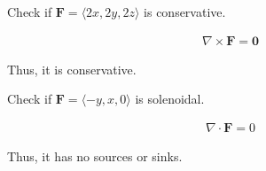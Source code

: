\begin{examplebox}
    Check if $\mathbf{F}=\langle 2x,2y,2z\rangle$ is conservative.

    \begin{align*}
        \nabla \times \mathbf{F} = \mathbf{0}
    \end{align*}

    Thus, it is conservative.
\end{examplebox}

\begin{examplebox}
    Check if $\mathbf{F}=\langle -y,x,0\rangle$ is solenoidal.

    \begin{align*}
        \nabla \cdot \mathbf{F} = 0
    \end{align*}

    Thus, it has no sources or sinks.
\end{examplebox}